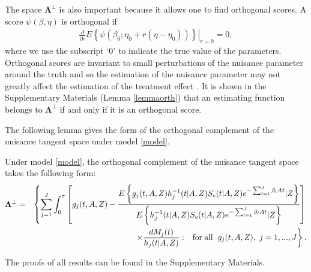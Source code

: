 \documentclass[11pt]{article}
\newcommand{\ee}{\end{eqnarray}}
\newcommand{\be}{\begin{eqnarray}}
\begin{document}
The space $\mathbf\Lambda^\perp$ is also important because it allows one to find orthogonal scores.
 A score $\psi(\beta, \eta)$ is orthogonal if 
\be\label{eq:ortho}
\left. \frac{\partial}{\partial r}{E}\left\{\psi(\beta_0 ; \eta_0 + r(\eta-\eta_0))\right\} \right|_{r=0}=0,
\ee
where we use the subscript `0' to indicate the true value of the parameters.
Orthogonal scores are invariant to small perturbations of the nuisance parameter around the truth and so the estimation of the nuisance parameter may not greatly affect the estimation of the treatment effect \citep{bickel1993efficient,newey1990semiparametric,newey1994asymptotic}. 
It is shown in the Supplementary Materials (Lemma \ref{lemmaorth}) that an estimating function belongs to $\mathbf\Lambda^\perp$ if and only if it is an orthogonal score.

The following lemma gives the form of the orthogonal complement of the nuisance tangent space under model \eqref{model}.
\begin{lemma}\label{ortlemma}
Under model \eqref{model}, the orthogonal complement of the nuisance tangent space takes the following form:
\be\label{ortcm}
\mathbf\Lambda^\perp&=&\left\{\sum_{j=1}^J\int_0^\tau \left[g_j(t,A,Z)-\frac{{E}\left\{g_j(t,A,Z)h_j^{-1}(t | A,Z)S_{c}(t | A,Z) e^{-\sum_{l=1}^J\beta_{l}At} | Z\right\}}{{E}\left\{h_j^{-1}(t | A,Z)S_{c}(t | A,Z) e^{-\sum_{l=1}^J\beta_{l}At} | Z\right\}}\right] \right.\nonumber\\
&&\left. \times  \frac{dM_j(t)}{h_j(t | A,Z)}: \;\;\:\mbox{for\;all }\;g_j(t,A,Z), \  j=1, ..., J
\right\}.
\ee
\end{lemma}
The proofs of all results can be found in the Supplementary Materials.
\end{document}
